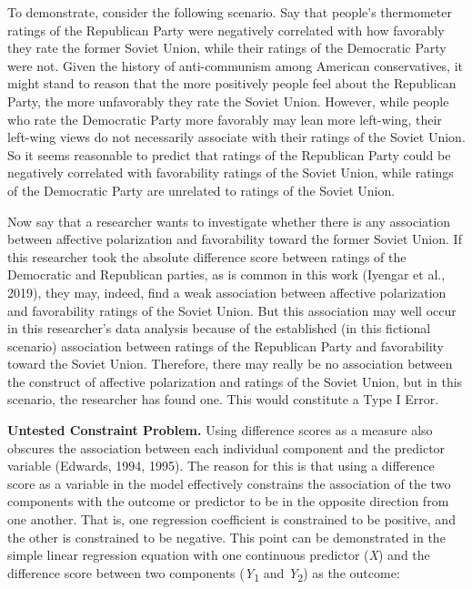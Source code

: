 \documentclass[authordate, meta]{jote-new-article}
\begin{document}
	To demonstrate, consider the following scenario. Say that people's thermometer ratings of the Republican Party were negatively correlated with how favorably they rate the former Soviet Union, while their ratings of the Democratic Party were not. Given the history of anti-communism among American conservatives, it might stand to reason that the more positively people feel about the Republican Party, the more unfavorably they rate the Soviet Union. However, while people who rate the Democratic Party more favorably may lean more left-wing, their left-wing views do not necessarily associate with their ratings of the Soviet Union. So it seems reasonable to predict that ratings of the Republican Party could be negatively correlated with favorability ratings of the Soviet Union, while ratings of the Democratic Party are unrelated to ratings of the Soviet Union.



	Now say that a researcher wants to investigate whether there is any association between affective polarization and favorability toward the former Soviet Union. If this researcher took the absolute difference score between ratings of the Democratic and Republican parties, as is common in this work (Iyengar et al., 2019), they may, indeed, find a weak association between affective polarization and favorability ratings of the Soviet Union. But this association may well occur in this researcher's data analysis because of the established (in this fictional scenario) association between ratings of the Republican Party and favorability toward the Soviet Union. Therefore, there may really be no association between the construct of affective polarization and ratings of the Soviet Union, but in this scenario, the researcher has found one. This would constitute a Type I Error.



	\textbf{Untested Constraint Problem. }Using difference scores as a measure also obscures the association between each individual component and the predictor variable (Edwards, 1994, 1995). The reason for this is that using a difference score as a variable in the model effectively constrains the association of the two components with the outcome or predictor to be in the opposite direction from one another. That is, one regression coefficient is constrained to be positive, and the other is constrained to be negative. This point can be demonstrated in the simple linear regression equation with one continuous predictor (\emph{X}) and the difference score between two components (\emph{Y}\textsubscript{1} and \emph{Y}\textsubscript{2}) as the outcome:
\end{document}
